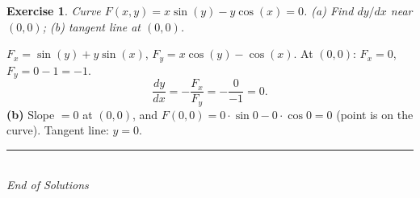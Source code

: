 \documentclass[12pt,a4paper]{article}
\theoremstyle{exstyle}
\newtheorem{exercise}{Exercise}[section]
\begin{document}
\begin{exercise}
Curve $F(x,y)=x\sin(y)-y\cos(x)=0$.
(a) Find $dy/dx$ near $(0,0)$; (b) tangent line at $(0,0)$.
\end{exercise}
\begin{solbox}
$F_x=\sin(y)+y\sin(x)$, $F_y=x\cos(y)-\cos(x)$.
At $(0,0)$: $F_x=0$, $F_y=0-1=-1$.
\[
  \frac{dy}{dx}=-\frac{F_x}{F_y}=-\frac{0}{-1}=0.
\]
\textbf{(b)} Slope $=0$ at $(0,0)$, and $F(0,0)=0\cdot\sin0-0\cdot\cos0=0$ (point is on the curve).
Tangent line: $\boxed{y=0}$.
\end{solbox}

\bigskip
\begin{center}
  \rule{0.6\linewidth}{0.4pt}\\[4pt]
  {\small\itshape End of Solutions}
\end{center}
\end{document}
